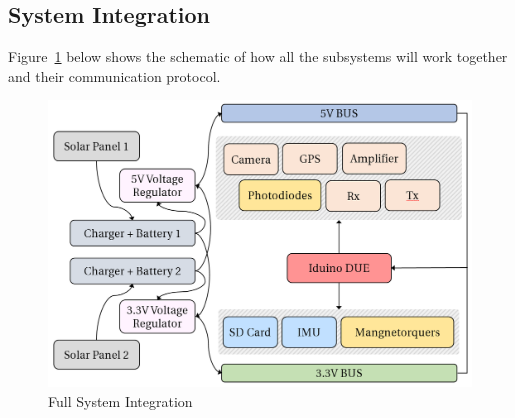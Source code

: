 \subsection{System Integration}
Figure~\ref{fig:integration} below shows the schematic of how all the subsystems will work together and their communication protocol.
\begin{figure}[H]
    \centering
    \includegraphics[width=0.75\linewidth]{./figures/integration}
    \caption{Full System Integration}
    \label{fig:integration}
\end{figure}